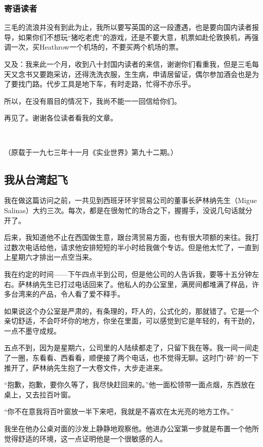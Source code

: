 \subsubsection*{寄语读者}
\par 三毛的流浪并没有到此为止，我所以要写英国的这一段遭遇，也是要向国内读者报导，如果你们不想玩“猪吃老虎”的游戏，还是不要大意，机票如赴伦敦换机，再强调一次，买Heathrow一个机场的，不要买两个机场的票。
\par 又及：我来此一个月，收到八十封国内读者的来信，谢谢你们看重我，但是三毛每天又念书又要跑采访，还得洗洗衣服，生生病，申请居留证，偶尔参加酒会也是为了要找门路。代步工具是地下车，有时走路，忙得不亦乐乎。
\par 所以，在没有眉目的情况下，我尚不能一一回信给你们。
\par 再见了。谢谢各位读者看我的文章。
\par  
\par （原载于一九七三年十一月《实业世界》第九十二期。）




\subsection{我从台湾起飞}

\par 我在做这篇访问之前，一共见到西班牙环宇贸易公司的董事长萨林纳先生（Migue Salinas）大约三次。每次，都是在很匆忙的场合之下，握握手，没说几句话就分开了。
\par 后来，我知道他不止在西国做生意，跟台湾贸易方面，也有很大项额的来往。我打过数次电话给他，请求他安排短短的半小时给我做个专访。但是他太忙了，一直到上星期六才排出一点空当来。
\par 我在约定的时间——下午四点半到公司，但是他公司的人告诉我，要等十五分钟左右。萨林纳先生已打过电话回来了。他私人的办公室里，满房间都堆满了样品，许多台湾来的产品，令人看了爱不释手。
\par 如果说这个办公室是严肃的，有条理的，吓人的，公式化的，那就错了。它是一个亲切舒适，不会吓坏你的地方，你坐在里面，可以感觉到它是年轻的，有干劲的，一点不墨守成规。
\par 五点不到，因为是星期六，公司里的人陆续都走了，只留下我在等。我一间一间走了一圈，东看看、西看看，顺便接了两个电话，也不觉得无聊。这时门“砰”的一下推开了，萨林纳先生抱了一大卷文件，大步走进来。
\par “抱歉，抱歉，要你久等了，我尽快赶回来的。”他一面松领带一面点烟，东西放在桌上，又去拉百叶窗。
\par “你不在意我将百叶窗放一半下来吧，我就是不喜欢在太光亮的地方工作。”
\par 我坐在他办公桌对面的沙发上静静地观察他。他进办公室第一步就是布置一个他所觉得舒适的环境，这一点证明他是一个很敏感的人。
